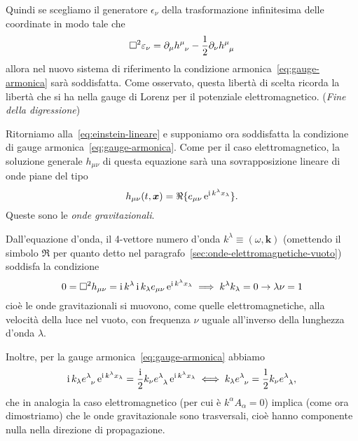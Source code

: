 Quindi se scegliamo il generatore $\epsilon_{\nu}$ della trasformazione
infinitesima delle coordinate in modo tale che
\begin{equation}
  \dalamb \epsilon_{\nu} = \partial_{\mu} \tensor{h}{^{\mu}_{\nu}} -
  \frac{1}{2} \partial_{\nu} \tensor{h}{^{\mu}_{\mu}}
\end{equation}
allora nel nuovo sistema di riferimento la condizione
armonica~\eqref{eq:gauge-armonica} sarà soddisfatta.  Come osservato, questa
libertà di scelta ricorda la libertà che si ha nella gauge di Lorenz per il
potenziale elettromagnetico. (\emph{Fine della digressione})

Ritorniamo alla~\eqref{eq:einstein-lineare} e supponiamo ora soddisfatta la
condizione di gauge armonica~\eqref{eq:gauge-armonica}.  Come per il caso
elettromagnetico, la soluzione generale $h_{\mu\nu}$ di questa equazione sarà
una sovrapposizione lineare di onde piane del tipo
\begin{equation}
  h_{\mu\nu}(t,\bm{x}) = \Re\{e_{\mu\nu} \operatorname{\mathrm{e}}^{\operatorname{\mathrm{i}} k^{\lambda}x_{\lambda}} \}.
\end{equation}
Queste sono le \emph{onde gravitazionali}.

Dall'equazione d'onda, il 4-vettore numero d'onda $k^{\lambda} \equiv (\omega,
\bm{k})$ (omettendo il simbolo $\Re$ per quanto detto nel
paragrafo~\ref{sec:onde-elettromagnetiche-vuoto}) soddisfa la condizione
\begin{equation}
  0 = \Box^{2} h_{\mu\nu} = \operatorname{\mathrm{i}} k^{\lambda} \operatorname{\mathrm{i}} k_{\lambda} e_{\mu\nu}
  \operatorname{\mathrm{e}}^{\operatorname{\mathrm{i}} k^{\lambda}x_{\lambda}} \implies k^{\lambda}k_{\lambda} = 0 \rightarrow \lambda \nu=1
\end{equation}
cioè le onde gravitazionali si muovono, come quelle elettromagnetiche, alla
velocità della luce nel vuoto, con frequenza $\nu$ uguale all'inverso della
lunghezza d'onda $\lambda$.

Inoltre, per la  gauge armonica~\eqref{eq:gauge-armonica} abbiamo
\begin{equation}
  \uimm k_{\lambda} \tensor{e}{^{\lambda}_{\nu}} \e^{\uimm k^{\lambda}
    x_{\lambda}} = \frac{\uimm}{2} k_{\nu}
  \tensor{e}{^{\lambda}_{\lambda}} \e^{\uimm k^{\lambda}x_{\lambda}} \iff
  k_{\lambda} \tensor{e}{^{\lambda}_{\nu}} = \frac{1}{2} k_{\nu}
  \tensor{e}{^{\lambda}_{\lambda}},
  \label{8.22}
\end{equation}
che in analogia la caso elettromagnetico (per cui è $k^{\alpha} A_{\alpha}=0$)
implica (come ora dimostriamo) che le onde gravitazionale sono trasversali, cioè
hanno componente nulla nella direzione di propagazione.

